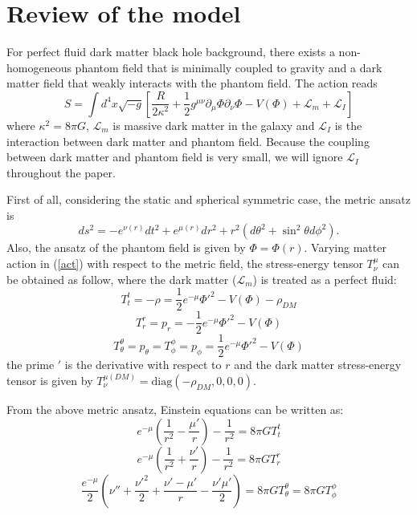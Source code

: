 \documentclass[a4paper,11pt]{article}
\begin{document}
\section{Review of the model} \label{sec2}
For perfect fluid dark matter black hole background, there exists a non-homogeneous phantom field that is minimally coupled to gravity and a dark matter field that weakly interacts with the phantom field. The action reads \cite{Li:2012zx}
\begin{equation}
    S=\int d^{4}x \sqrt{-g}[\frac{R}{2\kappa^{2}}+\frac{1}{2}g^{\mu\nu} \partial_{\mu}\Phi \partial_{\nu}\Phi-V(\Phi)+\mathcal{L}_{m}+\mathcal{L}_{I}]\label{act}
\end{equation}
where $\kappa^{2}=8\pi G$, $\mathcal{L}_{m}$ is massive dark matter in the galaxy and $\mathcal{L}_{I}$ is the interaction between dark matter and phantom field. Because the coupling between dark matter and phantom field is very small, we will ignore $\mathcal{L}_{I}$ throughout the paper.

First of all, considering the static and spherical symmetric case, the metric ansatz is 
\begin{equation}
    ds^{2}=-e^{\nu(r)}dt^{2}+e^{\mu(r)} dr^{2}+r^{2}(d\theta^{2}+\sin^{2}\theta d\phi^{2}).
\end{equation}
Also, the ansatz of the phantom field is given by $\Phi=\Phi(r)$.  Varying matter action in (\ref{act}) with respect to the metric field, the stress-energy tensor $T_\nu^\mu$ can be obtained as follow, where the dark matter ($\mathcal{L}_{m}$) is treated as a perfect fluid:
\begin{equation}
    T^{t}_{t}=-\rho=\frac{1}{2}e^{-\mu}\Phi'^{2}-V(\Phi)-\rho_{DM}\label{ttt}
\end{equation}
\begin{equation}
    T^{r}_{r}=p_{r}=-\frac{1}{2}e^{-\mu}\Phi'^{2}-V(\Phi)\label{trr}
\end{equation}
\begin{equation}
T^{\theta}_{\theta}=p_\theta=T^{\phi}_{\phi}=p_\phi=\frac{1}{2}e^{-\mu}\Phi'^{2}-V(\Phi)
\end{equation}
 the prime $'$ is the derivative with respect to $r$ and the dark matter stress-energy tensor is given by $T_{\nu}^{\mu (DM)}=\mathrm{diag}(-\rho_{DM},0,0,0)$.

From the above metric ansatz,  Einstein equations can be written as:
\begin{equation}\label{ett}
e^{-\mu}(\frac{1}{r^{2}}-\frac{\mu'}{r})-\frac{1}{r^{2}}=8\pi G T^{t}_{t}
\end{equation}
\begin{equation}\label{err}
e^{-\mu}(\frac{1}{r^{2}}+\frac{\nu'}{r})-\frac{1}{r^{2}}=8\pi G T^{r}_{r}
\end{equation}
\begin{equation} \label{ethth}
    \frac{e^{-\mu}}{2}(\nu''+\frac{\nu'^{2}}{2}+\frac{\nu'-\mu'}{r}-\frac{\nu' \mu'}{2})=8\pi G T^{\theta}_{\theta}=8\pi G T^{\phi}_{\phi}
\end{equation}
\end{document}
